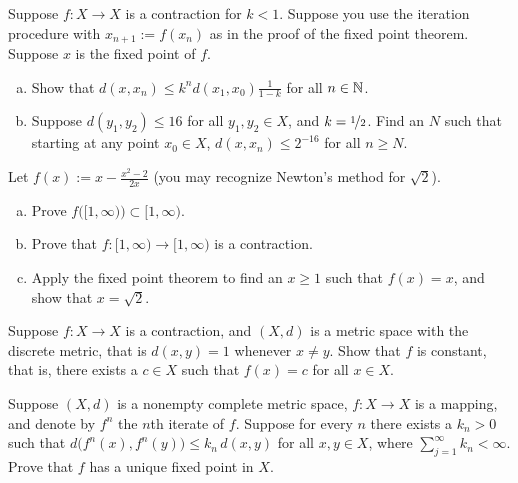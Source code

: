 \begin{exercise}
Suppose $f \colon X \to X$ is a contraction for $k < 1$.  Suppose you use the iteration
procedure with $x_{n+1} := f(x_n)$ as in the proof of the fixed point theorem.
Suppose $x$ is the fixed
point of $f$.
{\ }
\begin{enumerate}[a)]
\item
Show that $d(x,x_n) \leq k^n d(x_1,x_0) \frac{1}{1-k}$ for all $n \in {\mathbb{N}}$.
\item
Suppose $d(y_1,y_2) \leq 16$ for all $y_1,y_2 \in X$, and $k=
\nicefrac{1}{2}$.  Find an $N$ such that starting at any point $x_0 \in X$, 
$d(x,x_n) \leq 2^{-16}$ for all $n \geq N$.
\end{enumerate}
\end{exercise}

\begin{exercise}
Let $f(x) := x-\frac{x^2-2}{2x}$ (you may recognize Newton's method for
$\sqrt{2}$).
\begin{enumerate}[a)]
\item
Prove $f\bigl([1,\infty)\bigr) \subset [1,\infty)$.
\item
Prove that $f \colon [1,\infty) \to [1,\infty)$ is a contraction.
\item
Apply the fixed point theorem to find an $x \geq 1$ such that
$f(x) = x$, and show that $x = \sqrt{2}$.
\end{enumerate}
\end{exercise}

\begin{exercise}
Suppose $f \colon X \to X$ is a contraction, and $(X,d)$ is a metric space
with the discrete metric, that is $d(x,y) = 1$ whenever $x \not= y$.
Show that $f$ is constant, that is,
there exists a $c \in X$ such that $f(x) = c$ for all $x \in X$.
\end{exercise}

\begin{exercise}
Suppose $(X,d)$ is a nonempty complete metric space,
$f \colon X \to X$ is a mapping, and denote
by $f^n$ the $n$th iterate of $f$.  Suppose
for every $n$ there exists a $k_n > 0$ such that
$d\bigl(f^n(x),f^n(y)\bigr) \leq k_n \, d(x,y)$
for all $x,y \in X$,
where $\sum_{j=1}^\infty k_n < \infty$.
Prove that $f$ has a unique fixed point in $X$.
\end{exercise}
